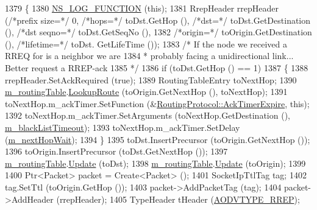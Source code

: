 \begin{DoxyCode}
1379 \{
1380   \hyperlink{log-macros-disabled_8h_a90b90d5bad1f39cb1b64923ea94c0761}{NS\_LOG\_FUNCTION} (\textcolor{keyword}{this});
1381   RrepHeader rrepHeader (\textcolor{comment}{/*prefix size=*/} 0, \textcolor{comment}{/*hops=*/} toDst.GetHop (), \textcolor{comment}{/*dst=*/} toDst.GetDestination (), \textcolor{comment}{
      /*dst seqno=*/} toDst.GetSeqNo (),
1382                                           \textcolor{comment}{/*origin=*/} toOrigin.GetDestination (), \textcolor{comment}{/*lifetime=*/} toDst.
      GetLifeTime ());
1383   \textcolor{comment}{/* If the node we received a RREQ for is a neighbor we are}
1384 \textcolor{comment}{   * probably facing a unidirectional link... Better request a RREP-ack}
1385 \textcolor{comment}{   */}
1386   \textcolor{keywordflow}{if} (toDst.GetHop () == 1)
1387     \{
1388       rrepHeader.SetAckRequired (\textcolor{keyword}{true});
1389       RoutingTableEntry toNextHop;
1390       \hyperlink{classns3_1_1aodv_1_1RoutingProtocol_a4e1003a34c8adc96db71096d88c98ae0}{m\_routingTable}.\hyperlink{classns3_1_1aodv_1_1RoutingTable_a90cbc8a2c65cd68ccdaf768fcbb5d723}{LookupRoute} (toOrigin.GetNextHop (), toNextHop);
1391       toNextHop.m\_ackTimer.SetFunction (&\hyperlink{classns3_1_1aodv_1_1RoutingProtocol_aa98fb4cc6871a7f5e918c4992a05b813}{RoutingProtocol::AckTimerExpire}, \textcolor{keyword}{
      this});
1392       toNextHop.m\_ackTimer.SetArguments (toNextHop.GetDestination (), 
      \hyperlink{classns3_1_1aodv_1_1RoutingProtocol_a23de7759e9c26ded382a09a860b4f987}{m\_blackListTimeout});
1393       toNextHop.m\_ackTimer.SetDelay (\hyperlink{classns3_1_1aodv_1_1RoutingProtocol_aeac3f146e52514d060a69f1a2d62690b}{m\_nextHopWait});
1394     \}
1395   toDst.InsertPrecursor (toOrigin.GetNextHop ());
1396   toOrigin.InsertPrecursor (toDst.GetNextHop ());
1397   \hyperlink{classns3_1_1aodv_1_1RoutingProtocol_a4e1003a34c8adc96db71096d88c98ae0}{m\_routingTable}.\hyperlink{classns3_1_1aodv_1_1RoutingTable_a39fb5335110164f4c1b97682a3812dc1}{Update} (toDst);
1398   \hyperlink{classns3_1_1aodv_1_1RoutingProtocol_a4e1003a34c8adc96db71096d88c98ae0}{m\_routingTable}.\hyperlink{classns3_1_1aodv_1_1RoutingTable_a39fb5335110164f4c1b97682a3812dc1}{Update} (toOrigin);
1399 
1400   Ptr<Packet> packet = Create<Packet> ();
1401   SocketIpTtlTag tag;
1402   tag.SetTtl (toOrigin.GetHop ());
1403   packet->AddPacketTag (tag);
1404   packet->AddHeader (rrepHeader);
1405   TypeHeader tHeader (\hyperlink{namespacens3_1_1aodv_a8cf417608302ba0ed75225c976944d44a034af3d66c569436a630b5ee35399e45}{AODVTYPE\_RREP});

\end{DoxyCode}
